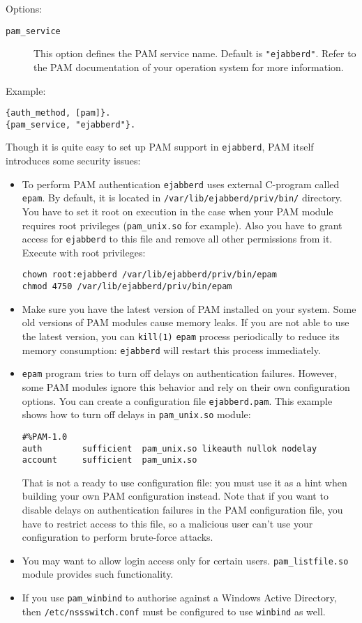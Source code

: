 \documentclass[a4paper,10pt]{book}
\newcommand{\ind}[1]{\begin{latexonly}\index{#1}\end{latexonly}}
\newcommand{\bracehack}{\def\{{\char"7B}\def\}{\char"7D}}
\newcommand{\titem}[1]{\item[\bracehack\texttt{#1}]}
\newcommand{\term}[1]{\texttt{#1}}
\newcommand{\ejabberd}{\texttt{ejabberd}}
\begin{document}
Options:
\begin{description}
\titem{pam\_service}\ind{options!pam\_service}This option defines the PAM service name.
Default is \term{"ejabberd"}. Refer to the PAM documentation of your operation system
for more information.
\end{description}

Example:
\begin{verbatim}
{auth_method, [pam]}.
{pam_service, "ejabberd"}.
\end{verbatim}

Though it is quite easy to set up PAM support in \ejabberd{}, PAM itself introduces some
security issues:

\begin{itemize}
\item To perform PAM authentication \ejabberd{} uses external C-program called
\term{epam}. By default, it is located in \verb|/var/lib/ejabberd/priv/bin/|
directory. You have to set it root on execution in the case when your PAM module
requires root privileges (\term{pam\_unix.so} for example). Also you have to grant access
for \ejabberd{} to this file and remove all other permissions from it.
Execute with root privileges:
\begin{verbatim}
chown root:ejabberd /var/lib/ejabberd/priv/bin/epam
chmod 4750 /var/lib/ejabberd/priv/bin/epam
\end{verbatim}
\item Make sure you have the latest version of PAM installed on your system.
Some old versions of PAM modules cause memory leaks. If you are not able to use the latest
version, you can \term{kill(1)} \term{epam} process periodically to reduce its memory
consumption: \ejabberd{} will restart this process immediately.
\item \term{epam} program tries to turn off delays on authentication failures.
However, some PAM modules ignore this behavior and rely on their own configuration options.
You can create a configuration file \term{ejabberd.pam}.
This example shows how to turn off delays in \term{pam\_unix.so} module:
\begin{verbatim}
#%PAM-1.0
auth        sufficient  pam_unix.so likeauth nullok nodelay
account     sufficient  pam_unix.so
\end{verbatim}
That is not a ready to use configuration file: you must use it
as a hint when building your own PAM configuration instead. Note that if you want to disable
delays on authentication failures in the PAM configuration file, you have to restrict access
to this file, so a malicious user can't use your configuration to perform brute-force
attacks.
\item You may want to allow login access only for certain users. \term{pam\_listfile.so}
module provides such functionality.
\item If you use \term{pam\_winbind} to authorise against a Windows Active Directory,
then \term{/etc/nssswitch.conf} must be configured to use \term{winbind} as well.
\end{itemize}
\end{document}
